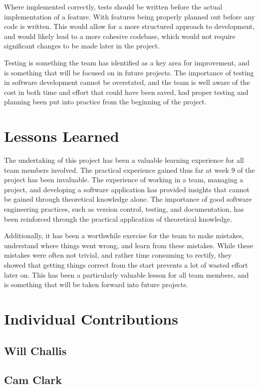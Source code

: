 \documentclass[conference]{IEEEtran}
\begin{document}
Where implemented correctly, tests should be written before the actual implementation of a feature. With features being properly planned out before any code is written. This would allow for a more structured approach to development, and would likely lead to a more cohesive codebase, which would not require significant changes to be made later in the project.

Testing is something the team has identified as a key area for improvement, and is something that will be focused on in future projects. The importance of testing in software development cannot be overstated, and the team is well aware of the cost in both time and effort that could have been saved, had proper testing and planning been put into practice from the beginning of the project.

\section{Lessons Learned}
The undertaking of this project has been a valuable learning experience for all team members involved. The practical experience gained thus far at week 9 of the project has been invaluable. The experience of working in a team, managing a project, and developing a software application has provided insights that cannot be gained through theoretical knowledge alone. The importance of good software engineering practices, such as version control, testing, and documentation, has been reinforced through the practical application of theoretical knowledge. 

Additionally, it has been a worthwhile exercise for the team to make mistakes, understand where things went wrong, and learn from these mistakes. While these mistakes were often not trivial, and rather time consuming to rectify, they showed that getting things correct from the start prevents a lot of wasted effort later on. This has been a particularly valuable lesson for all team members, and is something that will be taken forward into future projects.

\section{Individual Contributions}
\subsection{Will Challis}

\subsection{Cam Clark}
\end{document}
